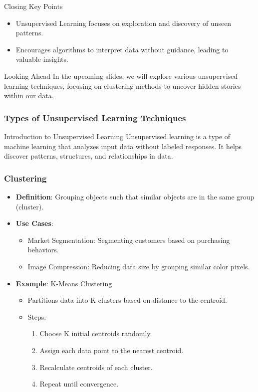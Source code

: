 \documentclass[aspectratio=169]{beamer}
\begin{document}
\begin{frame}[fragile]{Closing Key Points}
    \begin{itemize}
        \item Unsupervised Learning focuses on exploration and discovery of unseen patterns.
        \item Encourages algorithms to interpret data without guidance, leading to valuable insights.
    \end{itemize}
\end{frame}

\begin{frame}[fragile]{Looking Ahead}
    In the upcoming slides, we will explore various unsupervised learning techniques, focusing on clustering methods to uncover hidden stories within our data.
\end{frame}

\begin{frame}[fragile]
    \frametitle{Types of Unsupervised Learning Techniques}
    \begin{block}{Introduction to Unsupervised Learning}
        Unsupervised learning is a type of machine learning that analyzes input data without labeled responses. It helps discover patterns, structures, and relationships in data.
    \end{block}
\end{frame}

\begin{frame}[fragile]
    \frametitle{Clustering}
    \begin{itemize}
        \item \textbf{Definition}: Grouping objects such that similar objects are in the same group (cluster).
        \item \textbf{Use Cases}:
          \begin{itemize}
              \item Market Segmentation: Segmenting customers based on purchasing behaviors.
              \item Image Compression: Reducing data size by grouping similar color pixels.
          \end{itemize}
        \item \textbf{Example}: K-Means Clustering
          \begin{itemize}
              \item Partitions data into K clusters based on distance to the centroid.
              \item Steps:
                \begin{enumerate}
                    \item Choose K initial centroids randomly.
                    \item Assign each data point to the nearest centroid.
                    \item Recalculate centroids of each cluster.
                    \item Repeat until convergence.
                \end{enumerate}
          \end{itemize}
    \end{itemize}
\end{frame}
\end{document}
